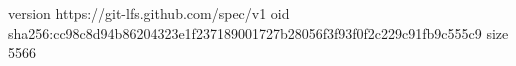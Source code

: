 version https://git-lfs.github.com/spec/v1
oid sha256:cc98c8d94b86204323e1f237189001727b28056f3f93f0f2c229c91fb9c555c9
size 5566
